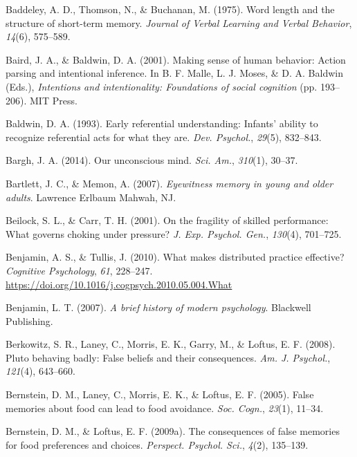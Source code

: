 \documentclass[
]{krantz}
\newlength{\cslhangindent}
\newenvironment{CSLReferences}[2] %
 {\begin{list}{}{%
  \setlength{\itemindent}{0pt}
  \setlength{\leftmargin}{0pt}
  \setlength{\parsep}{0pt}
  \ifodd #1
   \setlength{\leftmargin}{\cslhangindent}
   \setlength{\itemindent}{-1\cslhangindent}
  \fi
  \setlength{\itemsep}{#2\baselineskip}}}
 {\end{list}}
\begin{document}
\begin{CSLReferences}{1}{0}
Baddeley, A. D., Thomson, N., \& Buchanan, M. (1975). Word length and the structure of short-term memory. \emph{Journal of Verbal Learning and Verbal Behavior}, \emph{14}(6), 575--589.

Baird, J. A., \& Baldwin, D. A. (2001). Making sense of human behavior: Action parsing and intentional inference. In B. F. Malle, L. J. Moses, \& D. A. Baldwin (Eds.), \emph{Intentions and intentionality: Foundations of social cognition} (pp. 193--206). MIT Press.

Baldwin, D. A. (1993). Early referential understanding: Infants' ability to recognize referential acts for what they are. \emph{Dev. Psychol.}, \emph{29}(5), 832--843.

Bargh, J. A. (2014). Our unconscious mind. \emph{Sci. Am.}, \emph{310}(1), 30--37.

Bartlett, J. C., \& Memon, A. (2007). \emph{Eyewitness memory in young and older adults}. Lawrence Erlbaum Mahwah, NJ.

Beilock, S. L., \& Carr, T. H. (2001). On the fragility of skilled performance: What governs choking under pressure? \emph{J. Exp. Psychol. Gen.}, \emph{130}(4), 701--725.

Benjamin, A. S., \& Tullis, J. (2010). What makes distributed practice effective? \emph{Cognitive Psychology}, \emph{61}, 228--247. \url{https://doi.org/10.1016/j.cogpsych.2010.05.004.What}

Benjamin, L. T. (2007). \emph{A brief history of modern psychology}. Blackwell Publishing.

Berkowitz, S. R., Laney, C., Morris, E. K., Garry, M., \& Loftus, E. F. (2008). Pluto behaving badly: False beliefs and their consequences. \emph{Am. J. Psychol.}, \emph{121}(4), 643--660.

Bernstein, D. M., Laney, C., Morris, E. K., \& Loftus, E. F. (2005). False memories about food can lead to food avoidance. \emph{Soc. Cogn.}, \emph{23}(1), 11--34.

Bernstein, D. M., \& Loftus, E. F. (2009a). The consequences of false memories for food preferences and choices. \emph{Perspect. Psychol. Sci.}, \emph{4}(2), 135--139.


\end{CSLReferences}
\end{document}
